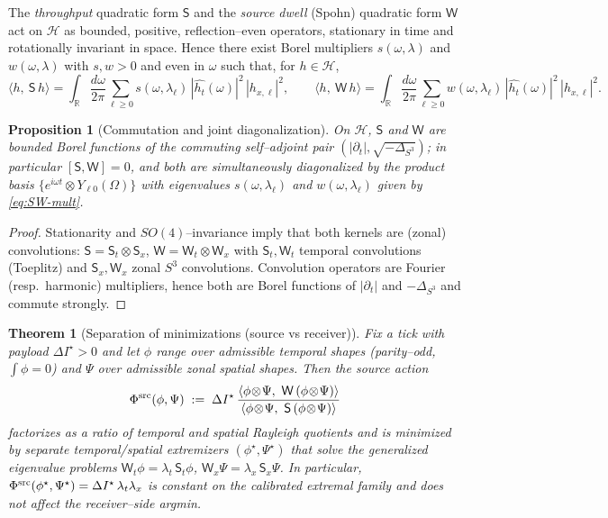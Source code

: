 \documentclass[10pt]{article}
\theoremstyle{definition}
\theoremstyle{plain}
\newtheorem{theorem}{Theorem}[section]
\newtheorem{proposition}{Proposition}[section]
\begin{document}
The \emph{throughput} quadratic form $\mathsf S$ and the \emph{source dwell} (Spohn) quadratic form
$\mathsf W$ act on $\mathcal H$ as bounded, positive, reflection–even operators, stationary in time
and rotationally invariant in space. Hence there exist Borel multipliers $s(\omega,\lambda)$ and
$w(\omega,\lambda)$ with $s,w>0$ and even in $\omega$ such that, for $h\in\mathcal H$,
\begin{equation}
\label{eq:SW-mult}
\langle h,\ \mathsf S\,h\rangle
=\int_{\mathbb R}\!\frac{d\omega}{2\pi}\sum_{\ell\ge0} s(\omega,\lambda_\ell)\,|\widehat{h_t}(\omega)|^2\,|h_{x,\ell}|^2,\qquad
\langle h,\ \mathsf W\,h\rangle
=\int_{\mathbb R}\!\frac{d\omega}{2\pi}\sum_{\ell\ge0} w(\omega,\lambda_\ell)\,|\widehat{h_t}(\omega)|^2\,|h_{x,\ell}|^2.
\end{equation}

\begin{proposition}[Commutation and joint diagonalization]
\label{prop:SW-commute}
On $\mathcal H$, $\mathsf S$ and $\mathsf W$ are bounded Borel functions of the commuting
self–adjoint pair $(|\partial_t|,\sqrt{-\Delta_{S^3}})$; in particular $[\mathsf S,\mathsf W]=0$,
and both are simultaneously diagonalized by the product basis
$\{e^{i\omega t}\otimes Y_{\ell 0}(\Omega)\}$ with eigenvalues $s(\omega,\lambda_\ell)$
and $w(\omega,\lambda_\ell)$ given by \eqref{eq:SW-mult}.
\end{proposition}

\begin{proof}
Stationarity and $SO(4)$–invariance imply that both kernels are (zonal) convolutions:
$\mathsf S=\mathsf S_t\otimes\mathsf S_x$, $\mathsf W=\mathsf W_t\otimes\mathsf W_x$ with
$\mathsf S_t,\mathsf W_t$ temporal convolutions (Toeplitz) and $\mathsf S_x,\mathsf W_x$
zonal $S^3$ convolutions. Convolution operators are Fourier (resp.\ harmonic) multipliers,
hence both are Borel functions of $|\partial_t|$ and $-\Delta_{S^3}$ and commute strongly.
\end{proof}

\begin{theorem}[Separation of minimizations (source vs receiver)]
\label{thm:separation}
Fix a tick with payload $\Delta I^\star>0$ and let $\phi$ range over admissible temporal shapes
(parity–odd, $\int\phi=0$) and $\Psi$ over admissible zonal spatial shapes. Then the source action
\[
\Phi^{\rm src}(\phi,\Psi)\;:=\;\Delta I^\star\,
\frac{\langle \phi\!\otimes\!\Psi,\ \mathsf W\,(\phi\!\otimes\!\Psi)\rangle}
     {\langle \phi\!\otimes\!\Psi,\ \mathsf S\,(\phi\!\otimes\!\Psi)\rangle}
\]
factorizes as a ratio of temporal and spatial Rayleigh quotients and is minimized by
\emph{separate} temporal/spatial extremizers $(\phi^\star,\Psi^\star)$ that solve the
generalized eigenvalue problems $\mathsf W_t\phi=\lambda_t\,\mathsf S_t\phi$,
$\mathsf W_x\Psi=\lambda_x\,\mathsf S_x\Psi$. In particular,
$\Phi^{\rm src}(\phi^\star,\Psi^\star)=\Delta I^\star\,\lambda_t\lambda_x$ is constant on the
calibrated extremal family and does not affect the receiver–side argmin.
\end{theorem}
\end{document}
